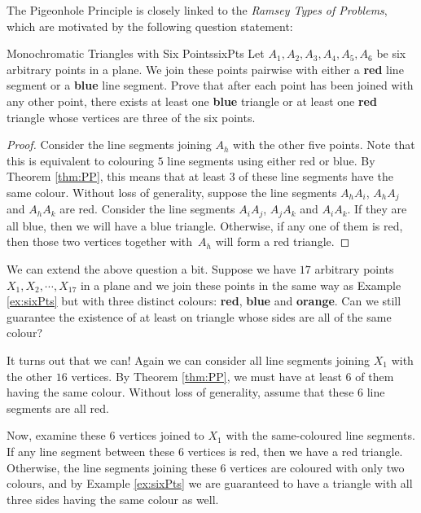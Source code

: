 \documentclass[math]{amznotes}
\theoremstyle{remark}
\newcommand{\0}{\mathbf{0}}
\newcommand{\1}{\mathbf{1}}
\begin{document}
The Pigeonhole Principle is closely linked to the \textit{Ramsey Types of Problems}, which are motivated by the following question statement:
\begin{exbox}{Monochromatic Triangles with Six Points}{sixPts}
    Let $A_1, A_2, A_3, A_4, A_5, A_6$ be six arbitrary points in a plane. We join these points pairwise with either a {\color{red} \textbf{red}} line segment or a {\color{blue} \textbf{blue}} line segment. Prove that after each point has been joined with any other point, there exists at least one {\color{blue} \textbf{blue}} triangle or at least one {\color{red} \textbf{red}} triangle whose vertices are three of the six points.
    \tcblower   
    \begin{proof}
        Consider the line segments joining $A_h$ with the other five points. Note that this is equivalent to colouring $5$ line segments using either red or blue. By Theorem \ref{thm:PP}, this means that at least $3$ of these line segments have the same colour. Without loss of generality, suppose the line segments $A_hA_i$, $A_hA_j$ and $A_hA_k$ are red. Consider the line segments $A_iA_j$, $A_jA_k$ and $A_iA_k$. If they are all blue, then we will have a blue triangle. Otherwise, if any one of them is red, then those two vertices together with~$A_h$ will form a red triangle.
    \end{proof}
\end{exbox}
We can extend the above question a bit. Suppose we have $17$ arbitrary points $X_1, X_2, \cdots, X_{17}$ in a plane and we join these points in the same way as Example \ref{ex:sixPts} but with three distinct colours: {\color{red} \textbf{red}}, {\color{blue} \textbf{blue}} and {\color{orange} \textbf{orange}}. Can we still guarantee the existence of at least on triangle whose sides are all of the same colour?

It turns out that we can! Again we can consider all line segments joining $X_1$ with the other $16$ vertices. By Theorem \ref{thm:PP}, we must have at least $6$ of them having the same colour. Without loss of generality, assume that these $6$ line segments are all red.

Now, examine these $6$ vertices joined to $X_1$ with the same-coloured line segments. If any line segment between these $6$ vertices is red, then we have a red triangle. Otherwise, the line segments joining these $6$ vertices are coloured with only two colours, and by Example \ref{ex:sixPts} we are guaranteed to have a triangle with all three sides having the same colour as well.
\end{document}
